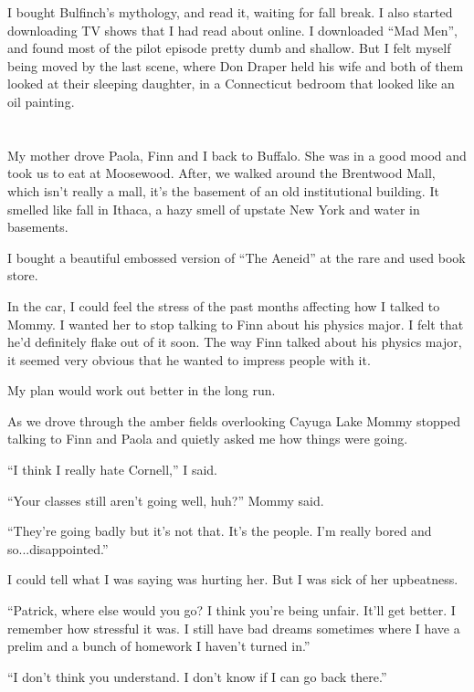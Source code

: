 I bought Bulfinch's mythology, and read it, waiting for fall break.  I also
started downloading TV shows that I had read about online.  I downloaded ``Mad
Men'', and found most of the pilot episode pretty dumb and shallow.  But I felt
myself being moved by the last scene, where Don Draper held his wife and both of
them looked at their sleeping daughter, in a Connecticut bedroom that looked
like an oil painting.

\section{}

My mother drove Paola, Finn and I back to Buffalo.  She was in a good mood and
took us to eat at Moosewood.  After, we walked around the Brentwood Mall, which
isn't really a mall, it's the basement of an old institutional building.  It
smelled like fall in Ithaca, a hazy smell of upstate New York and water in
basements. 

I bought a beautiful embossed version of ``The Aeneid'' at the rare and used book
store. 

In the car, I could feel the stress of the past months affecting how I talked
to Mommy. I  wanted her to stop talking to Finn about his physics major.  I
felt that he'd definitely flake out of it soon.  The way Finn talked about his
physics major, it seemed very obvious that he wanted to impress people with it. 

My plan would work out better in the long run.

As we drove through the amber fields overlooking Cayuga Lake Mommy stopped
talking to Finn and Paola and quietly asked me how things were going.

``I think I really hate Cornell,'' I said.

``Your classes still aren't going well, huh?'' Mommy said. 

``They're going badly but it's not that.  It's the people.  I'm really bored and
so...disappointed.''

I could tell what I was saying was hurting her.  But I was sick of her
upbeatness.

``Patrick, where else would you go?  I think you're being unfair.  It'll get
better.  I remember how stressful it was.  I still have bad dreams sometimes
where I have a prelim and a bunch of homework I haven't turned in.''

``I don't think you understand.  I don't know if I can go back there.''

